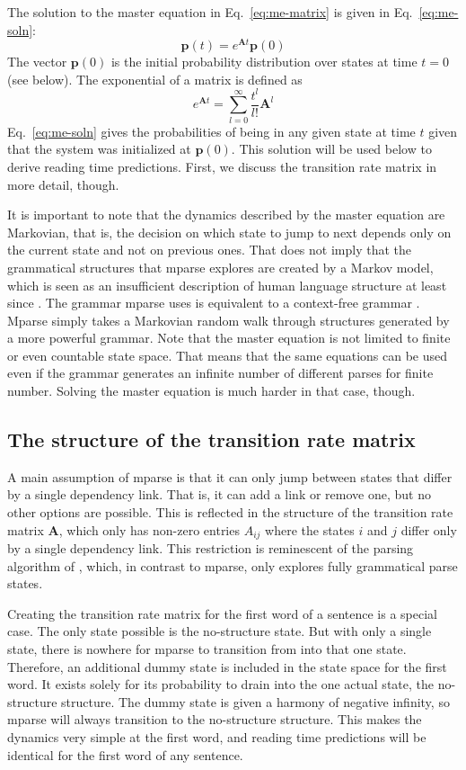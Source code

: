 \documentclass[a4paper, 12pt]{article}
\begin{document}
The solution to the master equation in Eq.~\ref{eq:me-matrix} is given in
Eq.~\ref{eq:me-soln}:
\begin{equation}\label{eq:me-soln}
    \mathbf{p}(t) = e^{\mathbf{A}t}\mathbf{p}(0)
\end{equation}
The vector $\mathbf{p}(0)$ is the initial probability distribution over states
at time $t = 0$ (see below). The exponential of a matrix is defined as
\[
    e^{\mathbf{A}t} = \sum_{l=0}^\infty \frac{t^l}{l!}\mathbf{A}^l
\]
Eq.~\ref{eq:me-soln} gives the probabilities of being in any given state at
time $t$ given that the system was initialized at $\mathbf{p}(0)$. This
solution will be used below to derive reading time predictions. First, we
discuss the transition rate matrix in more detail, though.

It is important to note that the dynamics described by the master equation are
Markovian, that is, the decision on which state to jump to next depends only on
the current state and not on previous ones. That does not imply that the
grammatical structures that mparse explores are created by a Markov model,
which is seen as an insufficient description of human language structure at
least since \citet{chomsky1957syntactic}. The grammar mparse uses is equivalent
to a context-free grammar \citep{gaifman1965dependency}. Mparse simply takes a
Markovian random walk through structures generated by a more powerful grammar.
Note that the master equation is not limited to finite or even countable state
space. That means that the same equations can be used even if the grammar
generates an infinite number of different parses for finite number. Solving the
master equation is much harder in that case, though.

\subsection{The structure of the transition rate matrix}
A main assumption of mparse is that it can only jump between states that differ
by a single dependency link. That is, it can add a link or remove one, but no
other options are possible. This is reflected in the structure of the
transition rate matrix $\mathbf{A}$, which only has non-zero entries $A_{ij}$
where the states $i$ and $j$ differ only by a single dependency link. This
restriction is reminescent of the parsing algorithm of \citet{hale2011what},
which, in contrast to mparse, only explores fully grammatical parse states.

Creating the transition rate matrix for the first word of a sentence is a
special case. The only state possible
is the no-structure state. But with only a single state, there is nowhere
for mparse to transition from into that one state. Therefore, an additional
dummy state is included in the state space for the first word. It
exists solely for its probability to drain into the one actual state, the
no-structure structure. The dummy state is given a harmony of negative
infinity, so mparse will always transition to the no-structure structure. This
makes the dynamics very simple at the first word, and reading time predictions
will be identical for the first word of any sentence.
\end{document}
